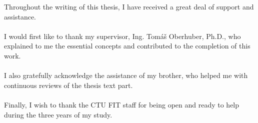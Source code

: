 \documentclass[english,bachelor,unicode]{ctufit-thesis}
\theoremstyle{plain}
\theoremstyle{definition}
\theoremstyle{remark}
\numberwithin{theorem}{chapter}
\begin{document}
\frontmatter\frontmatterinit %


\thispagestyle{empty}\cleardoublepage\maketitle %

\imprintpage %

\tableofcontents %
\listoffigures %
\begingroup
\let\clearpage\relax
\listoftables %
\listoflistings %
\endgroup

\begin{acknowledgmentpage}
Throughout the writing of this thesis, I have received a great deal of support and assistance.
\\
\\
I would first like to thank my supervisor, Ing. Tomáš Oberhuber, Ph.D., who explained to me the essential concepts and contributed to the completion of this work.
\\
\\
I also gratefully acknowledge the assistance of my brother, who helped me with continuous reviews of the thesis text part.
\\
\\
Finally, I wish to thank the CTU FIT staff for being open and ready to help during the three years of my study.
\end{acknowledgmentpage}
\end{document}

